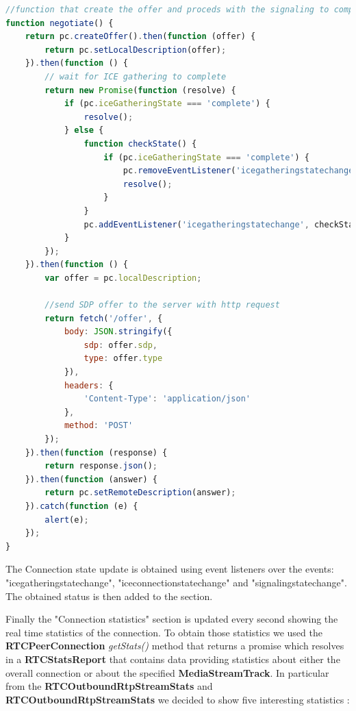 \documentclass[../main.tex]{subfiles}
\begin{document}
\begin{lstlisting}[language=JavaScript, caption=negotiate() function implementation]
//function that create the offer and proceds with the signaling to complete the connection
function negotiate() {
    return pc.createOffer().then(function (offer) {
        return pc.setLocalDescription(offer);
    }).then(function () {
        // wait for ICE gathering to complete
        return new Promise(function (resolve) {
            if (pc.iceGatheringState === 'complete') {
                resolve();
            } else {
                function checkState() {
                    if (pc.iceGatheringState === 'complete') {
                        pc.removeEventListener('icegatheringstatechange', checkState);
                        resolve();
                    }
                }
                pc.addEventListener('icegatheringstatechange', checkState);
            }
        });
    }).then(function () {
        var offer = pc.localDescription;

        //send SDP offer to the server with http request 
        return fetch('/offer', {
            body: JSON.stringify({
                sdp: offer.sdp,
                type: offer.type
            }),
            headers: {
                'Content-Type': 'application/json'
            },
            method: 'POST'
        });
    }).then(function (response) {
        return response.json();
    }).then(function (answer) {
        return pc.setRemoteDescription(answer);
    }).catch(function (e) {
        alert(e);
    });
}
\end{lstlisting}
\label{listing:negotiate}

The Connection state update is obtained using event listeners over the events: "icegatheringstatechange", "iceconnectionstatechange" and "signalingstatechange". The obtained status is then added to the section. 

Finally the "Connection statistics" section is updated every second showing the real time statistics of the connection. To obtain those statistics we used the \textbf{RTCPeerConnection} \textit{getStats()} method that returns a promise which resolves in a \textbf{RTCStatsReport} that contains data providing statistics about either the overall connection or about the specified \textbf{MediaStreamTrack}. In particular from the \textbf{RTCOutboundRtpStreamStats} and \textbf{RTCOutboundRtpStreamStats} we decided to show five interesting statistics \cite{statistics}:
\end{document}

